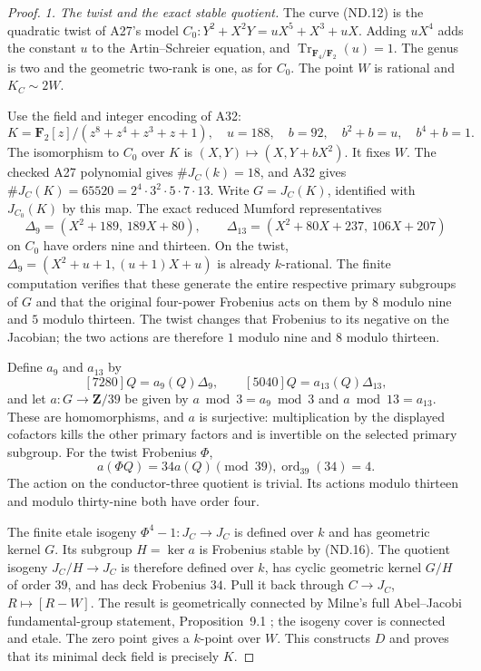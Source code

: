 \documentclass[11pt,a4paper]{article}
\begin{document}
\begin{proof}
\emph{1. The twist and the exact stable quotient.}
The curve (ND.12) is the quadratic twist of A27's model
$C_0:Y^2+X^2Y=uX^5+X^3+uX$. Adding $uX^4$ adds the constant
$u$ to the Artin--Schreier equation, and
$\operatorname{Tr}_{\mathbf F_4/\mathbf F_2}(u)=1$.
The genus is two and the geometric two-rank is one, as for
$C_0$. The point $W$ is rational and $K_C\sim2W$.

Use the field and integer encoding of A32:
\[
 K=\mathbf F_2[z]/(z^8+z^4+z^3+z+1),
       \quad u=188,\quad b=92,
       \quad b^2+b=u,\quad b^4+b=1.
 \tag{ND.14}
\]
The isomorphism to $C_0$ over $K$ is
$(X,Y)\mapsto(X,Y+bX^2)$. It fixes $W$.
The checked A27 polynomial gives $\#J_C(k)=18$, and A32 gives
$\#J_C(K)=65520=2^4\cdot3^2\cdot5\cdot7\cdot13$.
Write $G=J_C(K)$, identified with $J_{C_0}(K)$ by this map.
The exact reduced Mumford representatives
\[
 \Delta_9=(X^2+189,\,189X+80),\qquad
 \Delta_{13}=(X^2+80X+237,\,106X+207)
 \tag{ND.15}
\]
on $C_0$ have orders nine and thirteen. On the twist,
$\Delta_9=(X^2+u+1,(u+1)X+u)$ is already $k$-rational.
The finite computation verifies that these generate the entire
respective primary subgroups of $G$ and that the original
four-power Frobenius acts on them by $8$ modulo nine and $5$
modulo thirteen. The twist changes that Frobenius to its
negative on the Jacobian; the two actions are therefore $1$
modulo nine and $8$ modulo thirteen.

Define $a_9$ and $a_{13}$ by
\[
 [7280]Q=a_9(Q)\Delta_9,\qquad
 [5040]Q=a_{13}(Q)\Delta_{13},
\]
and let $a:G\to\mathbf Z/39$ be given by
$a\bmod3=a_9\bmod3$ and $a\bmod13=a_{13}$.
These are homomorphisms, and $a$ is surjective: multiplication
by the displayed cofactors kills the other primary factors
and is invertible on the selected primary subgroup.
For the twist Frobenius $\Phi$,
\[
                a(\Phi Q)=34a(Q)\pmod{39},
                        \operatorname{ord}_{39}(34)=4.
 \tag{ND.16}
\]
The action on the conductor-three quotient is trivial.
Its actions modulo thirteen and modulo thirty-nine both have
order four.

The finite etale isogeny $\Phi^4-1:J_C\to J_C$ is defined
over $k$ and has geometric kernel $G$.
Its subgroup $H=\ker a$ is Frobenius stable by (ND.16).
The quotient isogeny $J_C/H\to J_C$ is therefore defined
over $k$, has cyclic geometric kernel $G/H$ of order $39$,
and has deck Frobenius $34$. Pull it back through
$C\to J_C$, $R\mapsto[R-W]$. The result is geometrically
connected by Milne's full Abel--Jacobi fundamental-group
statement, Proposition~9.1 \cite{MilneJV}; the isogeny cover
is connected and etale. The zero point gives a $k$-point
over $W$. This constructs $D$ and proves that its minimal
deck field is precisely $K$.


\end{proof}
\end{document}
